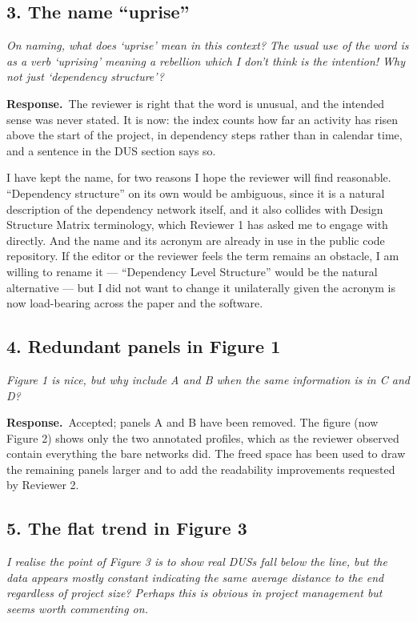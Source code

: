 \documentclass[11pt,a4paper]{article}
\newcommand{\rev}[1]{\medskip\noindent\textit{#1}\par\medskip}
\newcommand{\reply}{\noindent\textbf{Response.}\ }
\begin{document}
\subsection*{3. The name ``uprise''}

\rev{On naming, what does `uprise' mean in this context? The usual use of the word
is as a verb `uprising' meaning a rebellion which I don't think is the
intention! Why not just `dependency structure'?}

\reply The reviewer is right that the word is unusual, and the intended sense
was never stated. It is now: the index counts how far an activity has risen
above the start of the project, in dependency steps rather than in calendar
time, and a sentence in the DUS section says so.

I have kept the name, for two reasons I hope the reviewer will find reasonable.
``Dependency structure'' on its own would be ambiguous, since it is a natural
description of the dependency network itself, and it also collides with Design
Structure Matrix terminology, which Reviewer 1 has asked me to engage with
directly. And the name and its acronym are already in use in the public code
repository. If the editor or the reviewer feels the term remains an obstacle, I
am willing to rename it --- ``Dependency Level Structure'' would be the natural
alternative --- but I did not want to change it unilaterally given the acronym
is now load-bearing across the paper and the software.

\subsection*{4. Redundant panels in Figure 1}

\rev{Figure 1 is nice, but why include A and B when the same information is in C
and D?}

\reply Accepted; panels A and B have been removed. The figure (now Figure 2)
shows only the two annotated profiles, which as the reviewer observed contain
everything the bare networks did. The freed space has been used to draw the
remaining panels larger and to add the readability improvements requested by
Reviewer 2.

\subsection*{5. The flat trend in Figure 3}

\rev{I realise the point of Figure 3 is to show real DUSs fall below the line, but
the data appears mostly constant indicating the same average distance to the end
regardless of project size? Perhaps this is obvious in project management but
seems worth commenting on.}
\end{document}
